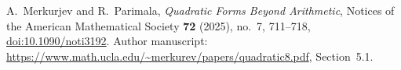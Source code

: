 A.~Merkurjev and R.~Parimala,
\emph{Quadratic Forms Beyond Arithmetic},
Notices of the American Mathematical Society \textbf{72} (2025), no.~7,
711--718, \href{https://doi.org/10.1090/noti3192}{doi:10.1090/noti3192}.
Author manuscript:
\url{https://www.math.ucla.edu/~merkurev/papers/quadratic8.pdf}, Section~5.1.
